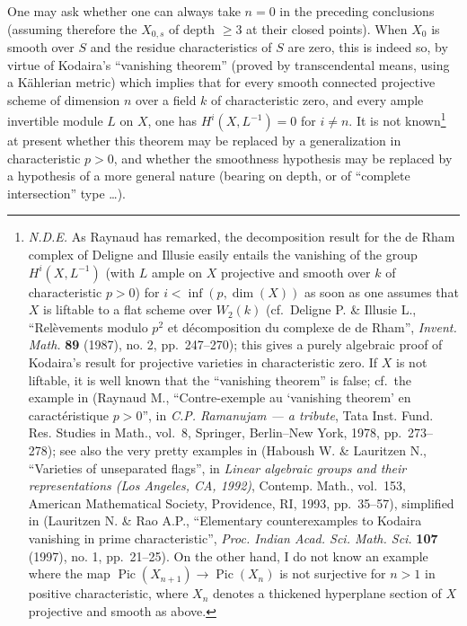 \documentclass[
]{article}
\begin{document}
One may ask whether one can always take \(n = 0\) in the preceding
conclusions (assuming therefore the \(X_{0,s}\) of depth \(\geqslant 3\)
at their closed points). When \(X_{0}\) is smooth over \(S\) and the
residue characteristics of \(S\) are zero, this is indeed so, by virtue
of Kodaira's ``vanishing theorem'' (proved by transcendental means,
using a Kählerian metric) which implies that for every smooth connected
projective scheme of dimension \(n\) over a field \(k\) of
characteristic zero, and every ample invertible module \(L\) on \(X\),
one has \(H^{i}(X, L^{-1}) = 0\) for \(i \neq n\). It is not
known\footnote{\emph{N.D.E.} As Raynaud has remarked, the decomposition
  result for the de Rham complex of Deligne and Illusie easily entails
  the vanishing of the group \(H^{i}(X, L^{-1})\) (with \(L\) ample on
  \(X\) projective and smooth over \(k\) of characteristic \(p > 0\))
  for \(i < \inf(p, \dim(X))\) as soon as one assumes that \(X\) is
  liftable to a flat scheme over \(W_{2}(k)\) (cf.~Deligne P. \& Illusie
  L., ``Relèvements modulo \(p^{2}\) et décomposition du complexe de de
  Rham'', \emph{Invent. Math.} \textbf{89} (1987), no. 2, pp.~247--270);
  this gives a purely algebraic proof of Kodaira's result for projective
  varieties in characteristic zero. If \(X\) is not liftable, it is well
  known that the ``vanishing theorem'' is false; cf.~the example in
  (Raynaud M., ``Contre-exemple au `vanishing theorem' en
  caractéristique \(p > 0\)'', in \emph{C.P. Ramanujam --- a tribute},
  Tata Inst. Fund. Res. Studies in Math., vol.~8, Springer, Berlin--New
  York, 1978, pp.~273--278); see also the very pretty examples in
  (Haboush W. \& Lauritzen N., ``Varieties of unseparated flags'', in
  \emph{Linear algebraic groups and their representations (Los Angeles,
  CA, 1992)}, Contemp. Math., vol.~153, American Mathematical Society,
  Providence, RI, 1993, pp.~35--57), simplified in (Lauritzen N. \& Rao
  A.P., ``Elementary counterexamples to Kodaira vanishing in prime
  characteristic'', \emph{Proc. Indian Acad. Sci. Math. Sci.}
  \textbf{107} (1997), no. 1, pp.~21--25). On the other hand, I do not
  know an example where the map
  \(\operatorname{Pic}(X_{n+1}) \to \operatorname{Pic}(X_{n})\) is not
  surjective for \(n > 1\) in positive characteristic, where \(X_{n}\)
  denotes a thickened hyperplane section of \(X\) projective and smooth
  as above.} at present whether this theorem may be replaced by a
generalization in characteristic \(p > 0\), and whether the smoothness
hypothesis may be replaced by a hypothesis of a more general nature
(bearing on depth, or of ``complete intersection'' type \ldots).
\end{document}
